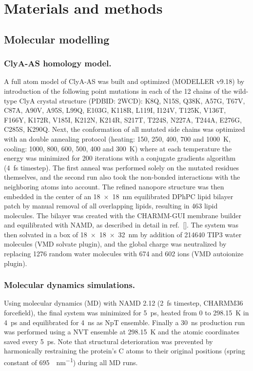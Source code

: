 \documentclass[twoside,twocolumn,9pt]{article}
\begin{document}
%
%
\section{Materials and methods}\label{sec:methods}

\subsection{Molecular modelling}

\subsubsection{ClyA-AS homology model.}
%
A full atom model of ClyA-AS\cite{Soskine-2013} was built and optimized (MODELLER v9.18\cite{Sali-1993}) by
introduction of the following point mutations in each of the 12 chains of the wild-type ClyA crystal structure
(PDBID: 2WCD\cite{Mueller-2009}): K8Q, N15S, Q38K, A57G, T67V, C87A, A90V, A95S, L99Q, E103G, K118R, L119I,
I124V, T125K, V136T, F166Y, K172R, V185I, K212N, K214R, S217T, T224S, N227A, T244A, E276G, C285S, K290Q. Next,
the conformation of all mutated side chains was optimized with an double annealing protocol (heating: 150,
250, 400, 700 and \SI{1000}{\kelvin}, cooling: 1000, 800, 600, 500, 400 and \SI{300}{\kelvin}) where at each
temperature the energy was minimized for 200 iterations with a conjugate gradients algorithm (\SI{4}{\fs}
timestep).\cite{Shanno-1980} The first anneal was performed solely on the mutated residues themselves, and the
second run also took the non-bonded interactions with the neighboring atoms into account. The refined nanopore
structure was then embedded in the center of an \SI{18x18}{\nm} equilibrated DPhPC lipid bilayer patch by
manual removal of all overlapping lipids, resulting in 463 lipid molecules. The bilayer was created with the
CHARMM-GUI\cite{Jo-2008} membrane builder\cite{Lee-2016} and equilibrated with NAMD\cite{Phillips-2005}, as
described in detail in ref.~[]. The system was then solvated in a box of \SI{18x18x32}{\nm}
by addition of 214640 TIP3 water molecules (VMD solvate plugin), and the global charge was neutralized by
replacing 1276 random water molecules with 674 \Na{} and 602 \Cl{} ions (VMD autoionize
plugin).\cite{Humphrey-1996}

\subsubsection{Molecular dynamics simulations.}
%
Using molecular dynamics (MD) with NAMD 2.12 (\SI{2}{\fs} timestep, CHARMM36 forcefield\cite{Best-2012}), the
final system was minimized for \SI{5}{\ps}, heated from 0 to \SI{298.15}{\kelvin} in \SI{4}{\ps} and
equilibrated for \SI{4}{\ns} as NpT ensemble.\cite{Aksimentiev-2005} Finally a \SI{30}{\ns} production run was
performed using a NVT ensemble at \SI{298.15}{\kelvin} and the atomic coordinates saved every \SI{5}{\ps}.
Note that structural deterioration was prevented by harmonically restraining the protein's C\textalpha{} atoms
to their original positions (spring constant of \SI{695}{\pN\per\nm}) during all MD
runs.\cite{Bhattacharya-2011}
\end{document}
